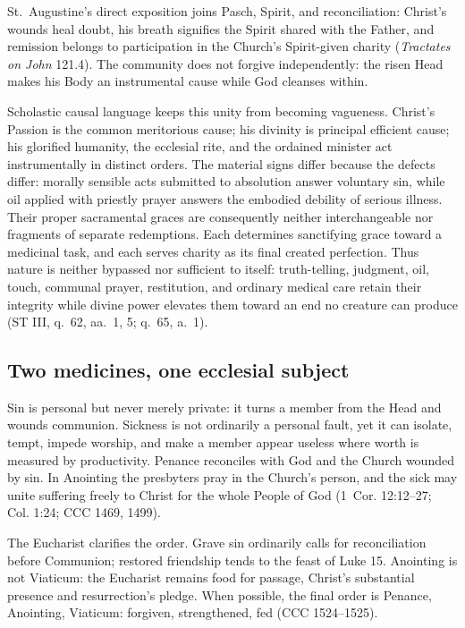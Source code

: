 St.~Augustine's direct exposition joins Pasch, Spirit, and reconciliation: Christ's wounds heal doubt, his breath signifies the Spirit shared with the Father, and remission belongs to participation in the Church's Spirit-given charity (\emph{Tractates on John} 121.4). The community does not forgive independently: the risen Head makes his Body an instrumental cause while God cleanses within.

Scholastic causal language keeps this unity from becoming vagueness. Christ's Passion is the common meritorious cause; his divinity is principal efficient cause; his glorified humanity, the ecclesial rite, and the ordained minister act instrumentally in distinct orders. The material signs differ because the defects differ: morally sensible acts submitted to absolution answer voluntary sin, while oil applied with priestly prayer answers the embodied debility of serious illness. Their proper sacramental graces are consequently neither interchangeable nor fragments of separate redemptions. Each determines sanctifying grace toward a medicinal task, and each serves charity as its final created perfection. Thus nature is neither bypassed nor sufficient to itself: truth-telling, judgment, oil, touch, communal prayer, restitution, and ordinary medical care retain their integrity while divine power elevates them toward an end no creature can produce (ST III, q.~62, aa.~1, 5; q.~65, a.~1).

\subsection{Two medicines, one ecclesial subject}

Sin is personal but never merely private: it turns a member from the Head and wounds communion. Sickness is not ordinarily a personal fault, yet it can isolate, tempt, impede worship, and make a member appear useless where worth is measured by productivity. Penance reconciles with God and the Church wounded by sin. In Anointing the presbyters pray in the Church's person, and the sick may unite suffering freely to Christ for the whole People of God (1~Cor. 12:12--27; Col. 1:24; CCC 1469, 1499).

The Eucharist clarifies the order. Grave sin ordinarily calls for reconciliation before Communion; restored friendship tends to the feast of Luke 15. Anointing is not Viaticum: the Eucharist remains food for passage, Christ's substantial presence and resurrection's pledge. When possible, the final order is Penance, Anointing, Viaticum: forgiven, strengthened, fed (CCC 1524--1525).

